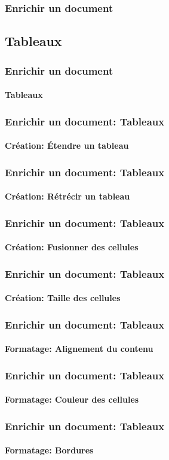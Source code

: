 \documentclass[xcolor=table]{beamer}
\begin{document}
\begin{frame}
\frametitle{Enrichir un document}

\end{frame}

\subsection{Tableaux}

\begin{frame}
\frametitle{Enrichir un document}
\framesubtitle{Tableaux}

\end{frame}

\begin{frame}
\frametitle{Enrichir un document: Tableaux}
\framesubtitle{Création: Étendre un tableau}

\end{frame}

\begin{frame}
\frametitle{Enrichir un document: Tableaux}
\framesubtitle{Création: Rétrécir un tableau}

\end{frame}

\begin{frame}
\frametitle{Enrichir un document: Tableaux}
\framesubtitle{Création: Fusionner des cellules}

\end{frame}

\begin{frame}
\frametitle{Enrichir un document: Tableaux}
\framesubtitle{Création: Taille des cellules}

\end{frame}

\begin{frame}
\frametitle{Enrichir un document: Tableaux}
\framesubtitle{Formatage: Alignement du contenu}

\end{frame}

\begin{frame}
\frametitle{Enrichir un document: Tableaux}
\framesubtitle{Formatage: Couleur des cellules}

\end{frame}

\begin{frame}
\frametitle{Enrichir un document: Tableaux}
\framesubtitle{Formatage: Bordures}

\end{frame}
\end{document}
